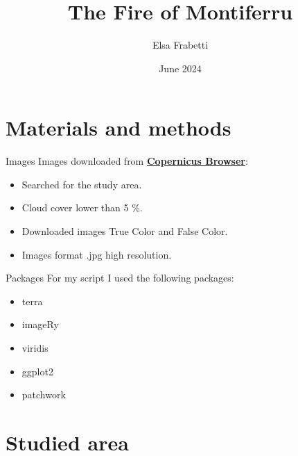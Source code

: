 \documentclass{beamer} %
\title{The Fire of Montiferru}
\author{Elsa Frabetti}
\institute{Global change ecology - Unibo}
\date{June 2024}
\begin{document}
\maketitle %


\section{Materials and methods} %

\begin{frame}{Images} %
    Images downloaded from \textbf{\href{https://browser.dataspace.copernicus.eu}{Copernicus Browser}}:
    \bigskip
    \begin{itemize}
        \item Searched for the study area.
        \item  Cloud cover lower than 5 \%.
        \item Downloaded images True Color and False Color.
        \item Images format .jpg high resolution.
    \end{itemize}
\end{frame}

\begin{frame}{Packages} 
    For my script I used the following packages:
    \bigskip %
    \begin{itemize} %
        \item terra
        \item imageRy
        \item viridis
        \item ggplot2
        \item patchwork
        \end{itemize}
\end{frame}



\section{Studied area} %
\end{document}
